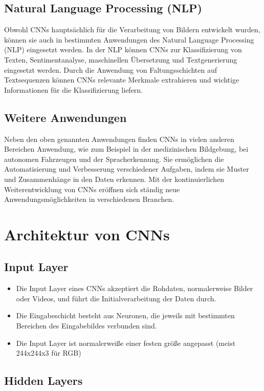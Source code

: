 \subsection{Natural Language Processing (NLP)}

	Obwohl CNNs hauptsächlich für die Verarbeitung von Bildern entwickelt wurden, können sie auch in bestimmten Anwendungen des Natural Language Processing (NLP) eingesetzt werden.
	In der NLP können CNNs zur Klassifizierung von Texten, Sentimentanalyse, maschinellen Übersetzung und Textgenerierung eingesetzt werden.
	Durch die Anwendung von Faltungsschichten auf Textsequenzen können CNNs relevante Merkmale extrahieren und wichtige Informationen für die Klassifizierung liefern.

\subsection{Weitere Anwendungen}

	Neben den oben genannten Anwendungen finden CNNs in vielen anderen Bereichen Anwendung, wie zum Beispiel in der medizinischen Bildgebung, bei autonomen Fahrzeugen und der Spracherkennung.
	Sie ermöglichen die Automatisierung und Verbesserung verschiedener Aufgaben, indem sie Muster und Zusammenhänge in den Daten erkennen.
	Mit der kontinuierlichen Weiterentwicklung von CNNs eröffnen sich ständig neue Anwendungsmöglichkeiten in verschiedenen Branchen.

\section{Architektur von CNNs}

\subsection{Input Layer}
\begin{itemize}
  \item Die Input Layer eines CNNs akzeptiert die Rohdaten, normalerweise Bilder oder Videos, und führt die Initialverarbeitung der Daten durch.
  \item Die Eingabeschicht besteht aus Neuronen, die jeweils mit bestimmten Bereichen des Eingabebildes verbunden sind.
  \item Die Input Layer ist normalerweiße einer festen größe angepasst (meist 244x244x3 für RGB)
\end{itemize}

\subsection{Hidden Layers}

